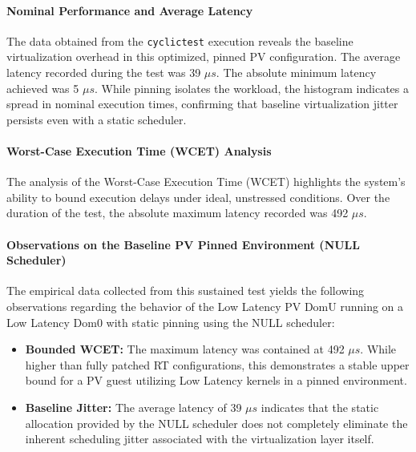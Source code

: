 \paragraph{Nominal Performance and Average
Latency}\label{nominal-performance-and-average-latency-27}

The data obtained from the \texttt{cyclictest} execution reveals the
baseline virtualization overhead in this optimized, pinned PV
configuration. The average latency recorded during the test was 39 $\mu s$.
The absolute minimum latency achieved was 5 $\mu s$. While pinning isolates
the workload, the histogram indicates a spread in nominal execution
times, confirming that baseline virtualization jitter persists even with
a static scheduler.

\paragraph{Worst-Case Execution Time (WCET)
Analysis}\label{worst-case-execution-time-wcet-analysis-29}

The analysis of the Worst-Case Execution Time (WCET) highlights the
system's ability to bound execution delays under ideal, unstressed
conditions. Over the duration of the test, the absolute maximum latency
recorded was 492 $\mu s$.

\paragraph{Observations on the Baseline PV Pinned Environment (NULL
Scheduler)}\label{observations-on-the-baseline-pv-pinned-environment-null-scheduler}

The empirical data collected from this sustained test yields the
following observations regarding the behavior of the Low Latency PV DomU
running on a Low Latency Dom0 with static pinning using the NULL
scheduler:

\begin{itemize}
\item
  \textbf{Bounded WCET:} The maximum latency was contained at 492 $\mu s$.
  While higher than fully patched RT configurations, this demonstrates a
  stable upper bound for a PV guest utilizing Low Latency kernels in a
  pinned environment.
\item
  \textbf{Baseline Jitter:} The average latency of 39 $\mu s$ indicates that
  the static allocation provided by the NULL scheduler does not
  completely eliminate the inherent scheduling jitter associated with
  the virtualization layer itself.
\end{itemize}

